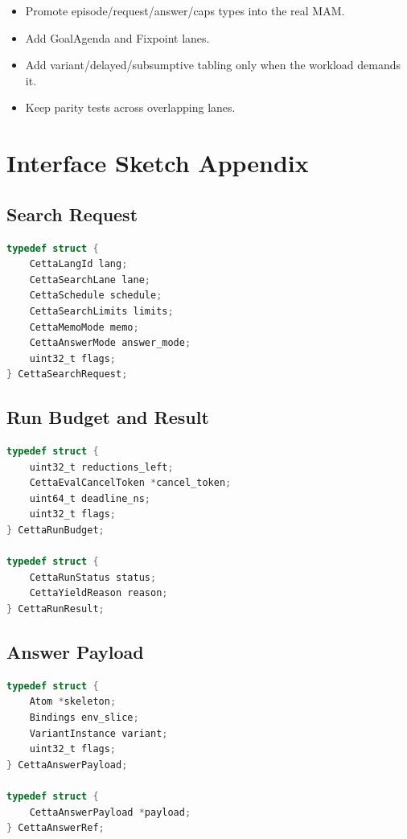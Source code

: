 \documentclass[11pt]{article}
\newcommand{\MAM}{MAM}
\begin{document}
\begin{itemize}[leftmargin=*]
  \item Promote episode/request/answer/caps types into the real \MAM{}.
  \item Add GoalAgenda and Fixpoint lanes.
  \item Add variant/delayed/subsumptive tabling only when the workload demands it.
  \item Keep parity tests across overlapping lanes.
\end{itemize}

\section{Interface Sketch Appendix}

\subsection{Search Request}

\begin{lstlisting}[language=C]
typedef struct {
    CettaLangId lang;
    CettaSearchLane lane;
    CettaSchedule schedule;
    CettaSearchLimits limits;
    CettaMemoMode memo;
    CettaAnswerMode answer_mode;
    uint32_t flags;
} CettaSearchRequest;
\end{lstlisting}

\subsection{Run Budget and Result}

\begin{lstlisting}[language=C]
typedef struct {
    uint32_t reductions_left;
    CettaEvalCancelToken *cancel_token;
    uint64_t deadline_ns;
    uint32_t flags;
} CettaRunBudget;

typedef struct {
    CettaRunStatus status;
    CettaYieldReason reason;
} CettaRunResult;
\end{lstlisting}

\subsection{Answer Payload}

\begin{lstlisting}[language=C]
typedef struct {
    Atom *skeleton;
    Bindings env_slice;
    VariantInstance variant;
    uint32_t flags;
} CettaAnswerPayload;

typedef struct {
    CettaAnswerPayload *payload;
} CettaAnswerRef;
\end{lstlisting}
\end{document}
